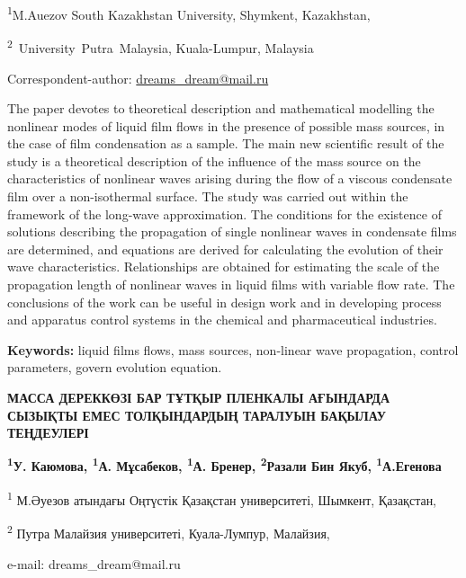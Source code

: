 


\begin{affiliation}
\textsuperscript{1}M.Auezov South Kazakhstan University, Shymkent, Kazakhstan,

\textsuperscript{2}~University~Putra~Malaysia, Kuala-Lumpur, Malaysia

\raggedright \textsuperscript{\envelope } Correspondent-author: \href{mailto:dreams\_dream@mail.ru}{dreams\_dream@mail.ru}
\end{affiliation}

The paper devotes to theoretical description and mathematical modelling
the nonlinear modes of liquid film flows in the presence of possible
mass sources, in the case of film condensation as a sample. The main new
scientific result of the study is a theoretical description of the
influence of the mass source on the characteristics of nonlinear waves
arising during the flow of a viscous condensate film over a
non-isothermal surface. The study was carried out within the framework
of the long-wave approximation. The conditions for the existence of
solutions describing the propagation of single nonlinear waves in
condensate films are determined, and equations are derived for
calculating the evolution of their wave characteristics. Relationships
are obtained for estimating the scale of the propagation length of
nonlinear waves in liquid films with variable flow rate. The conclusions
of the work can be useful in design work and in developing process and
apparatus control systems in the chemical and pharmaceutical industries.

{\bfseries Keywords:} liquid films flows, mass sources, non-linear wave
propagation, control parameters, govern evolution equation.

\begin{articleheader}
{\bfseries МАССА ДЕРЕККӨЗІ БАР ТҰТҚЫР ПЛЕНКАЛЫ АҒЫНДАРДА СЫЗЫҚТЫ ЕМЕС
ТОЛҚЫНДАРДЫҢ ТАРАЛУЫН БАҚЫЛАУ ТЕҢДЕУЛЕРІ}

{\bfseries
\textsuperscript{1}У. Каюмова\textsuperscript{\envelope },
\textsuperscript{1}А. Мұсабеков,
\textsuperscript{1}А. Бренер,
\textsuperscript{2}Разали Бин Якуб,
\textsuperscript{1}А.Егенова
}
\end{articleheader}

\begin{affiliation}
\textsuperscript{1} М.Әуезов атындағы Оңтүстік Қазақстан университеті, Шымкент, Қазақстан,

\textsuperscript{2} Путра Малайзия университеті, Куала-Лумпур, Малайзия,

e-mail: dreams\_dream@mail.ru
\end{affiliation}

